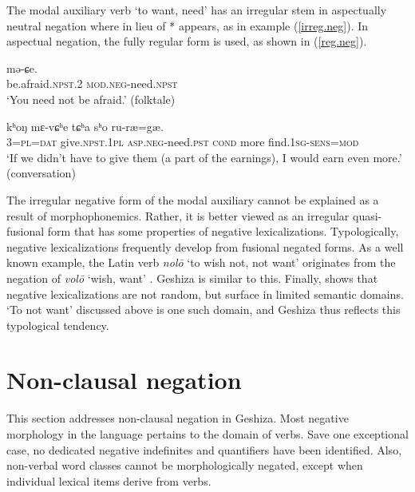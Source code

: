 \documentclass[output=paper,colorlinks,citecolor=brown]{langscibook}
\begin{document}
The modal auxiliary verb  `to want, need' has an irregular stem in aspectually neutral negation where  in lieu of * appears, as in example (\ref{irreg.neg}). In aspectual negation, the fully regular form  is used, as shown in (\ref{reg.neg}).

\ea
\label{irreg.neg}
 		{mə-ɕe}.\\ 
      be.afraid.\textsc{npst.2} \textsc{mod.neg}-need.\textsc{npst}\\ 
\glt `You need not be afraid.' (folktale)
\z

\ea
\label{reg.neg}
 {kʰoŋ} {mɛ-vɕʰe} {tɕʰa} {sʰo} {ru-ræ=gæ.}\\ 
     3=\textsc{pl}=\textsc{dat} give.\textsc{npst.1pl} 
     \textsc{asp.neg}-need.\textsc{pst} \textsc{cond}
     more find.\textsc{1sg-sens}=\textsc{mod}\\ 
\glt `If we didn't have to give them (a part of the earnings), I would earn even more.' (conversation)
\z

The irregular negative form of the modal auxiliary cannot be explained as a result of morphophonemics. Rather, it is better viewed as an irregular quasi-fusional form that has some properties of negative lexicalizations. Typologically, negative lexicalizations frequently develop from fusional negated forms. As a well known example, 
the Latin verb \textit{nolō} ‘to wish not, not want’ originates from the negation of \textit{volō} ‘wish, want’ \citep [829] {WaldeHofmann1938}. Geshiza  is similar to this. Finally, \citet{Veselinova2013lexicalization} shows that negative lexicalizations are not random, but surface in limited semantic domains. `To not want' discussed above is one such domain, and Geshiza thus reflects this typological tendency.

\section{Non-clausal negation}
This section addresses non-clausal negation in Geshiza. Most negative morphology in the language pertains to the domain of verbs. Save one exceptional case, no dedicated negative indefinites and quantifiers have been identified. Also, non-verbal word classes cannot be morphologically negated, except when individual lexical items derive from verbs.
\end{document}
